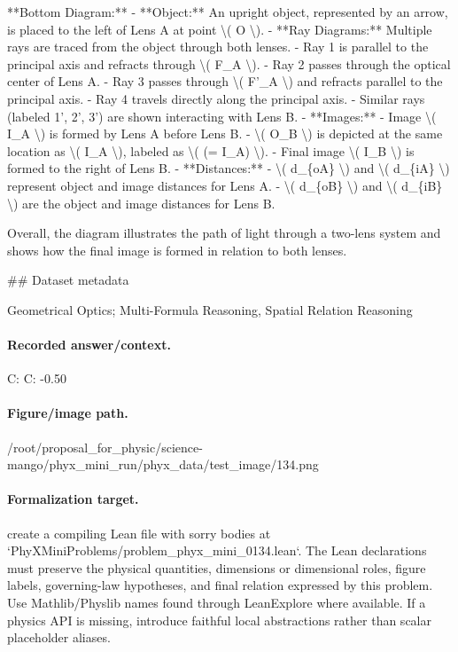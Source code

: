 **Bottom Diagram:**
- **Object:** An upright object, represented by an arrow, is placed to the left of Lens A at point \textbackslash{}( O \textbackslash{}).
- **Ray Diagrams:** Multiple rays are traced from the object through both lenses.
  - Ray 1 is parallel to the principal axis and refracts through \textbackslash{}( F\_A \textbackslash{}).
  - Ray 2 passes through the optical center of Lens A.
  - Ray 3 passes through \textbackslash{}( F'\_A \textbackslash{}) and refracts parallel to the principal axis.
  - Ray 4 travels directly along the principal axis.
  - Similar rays (labeled 1', 2', 3') are shown interacting with Lens B.
- **Images:** 
  - Image \textbackslash{}( I\_A \textbackslash{}) is formed by Lens A before Lens B.
  - \textbackslash{}( O\_B \textbackslash{}) is depicted at the same location as \textbackslash{}( I\_A \textbackslash{}), labeled as \textbackslash{}( (= I\_A) \textbackslash{}).
  - Final image \textbackslash{}( I\_B \textbackslash{}) is formed to the right of Lens B.
- **Distances:**
  - \textbackslash{}( d\_\{oA\} \textbackslash{}) and \textbackslash{}( d\_\{iA\} \textbackslash{}) represent object and image distances for Lens A.
  - \textbackslash{}( d\_\{oB\} \textbackslash{}) and \textbackslash{}( d\_\{iB\} \textbackslash{}) are the object and image distances for Lens B.

Overall, the diagram illustrates the path of light through a two-lens system and shows how the final image is formed in relation to both lenses.

\#\# Dataset metadata

Geometrical Optics; Multi-Formula Reasoning, Spatial Relation Reasoning

\paragraph{Recorded answer/context.}
C: C: -0.50

\paragraph{Figure/image path.}
/root/proposal\_for\_physic/science-mango/phyx\_mini\_run/phyx\_data/test\_image/134.png

\paragraph{Formalization target.}
create a compiling Lean file with sorry bodies at `PhyXMiniProblems/problem\_phyx\_mini\_0134.lean`. The Lean declarations must preserve the physical quantities, dimensions or dimensional roles, figure labels, governing-law hypotheses, and final relation expressed by this problem.
Use Mathlib/Physlib names found through LeanExplore where available. If a physics API is missing, introduce faithful local abstractions rather than scalar placeholder aliases.

